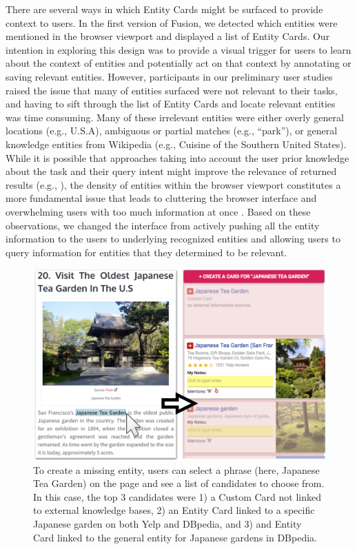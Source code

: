 There are several ways in which Entity Cards might be surfaced to provide context to users. In the first version of Fusion, we detected which entities were mentioned in the browser viewport and displayed a list of Entity Cards. Our intention in exploring this design was to provide a visual trigger for users to learn about the context of entities and potentially act on that context by annotating or saving relevant entities. However, participants in our preliminary user studies raised the issue that many of entities surfaced were not relevant to their tasks, and having to sift through the list of Entity Cards and locate relevant entities was time consuming. Many of these irrelevant entities were either overly general locations (e.g., U.S.A), ambiguous or partial matches (e.g., ``park''), or general knowledge entities from Wikipedia (e.g., Cuisine of the Southern United States). While it is possible that approaches taking into account the user prior knowledge about the task and their query intent might improve the relevance of returned results (e.g., \cite{pasupat2014zero}), the density of entities within the browser viewport constitutes a more fundamental issue that leads to cluttering the browser interface and overwhelming users with too much information at once \cite{wilson2008improving}. Based on these observations, we changed the interface from actively pushing all the entity information to the users to underlying recognized entities and allowing users to query information for entities that they determined to be relevant.

\begin{figure}
    \centering
    \includegraphics[width=0.6\columnwidth]{Chapters/Fusion/custom4.png}
    \caption{To create a missing entity, users can select a phrase (here, Japanese Tea Garden) on the page and see a list of candidates to choose from. In this case, the top 3 candidates were 1) a Custom Card not linked to external knowledge bases, 2) an Entity Card linked to a specific Japanese garden on both Yelp and DBpedia, and 3) and Entity Card linked to the general entity for Japanese gardens in DBpedia.}
    \label{fig:custom}
\end{figure}


